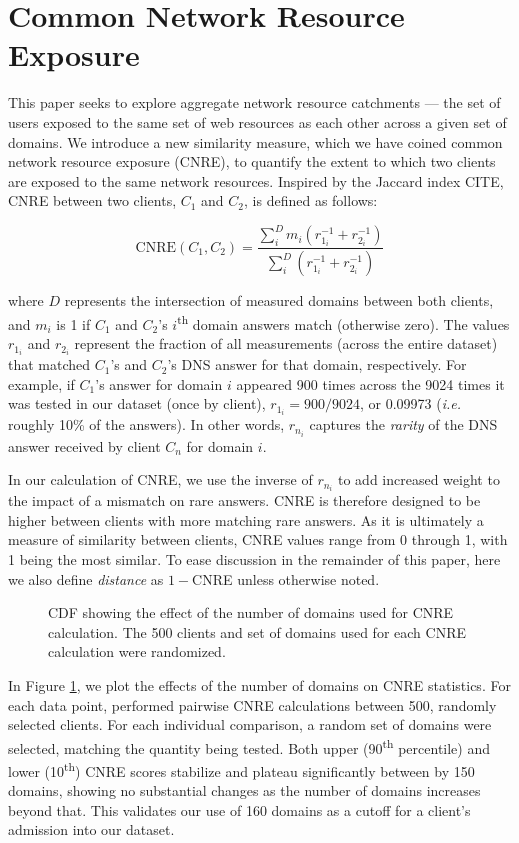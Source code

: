 \section{Common Network Resource Exposure} \label{sect:cnre}

This paper seeks to explore aggregate network resource catchments --- the set of
users exposed to the same set of web resources as each other across a given set
of domains. We introduce a new similarity measure, which we have coined common
network resource exposure (CNRE), to quantify the extent to which two clients
are exposed to the same network resources. Inspired by the Jaccard index CITE,
CNRE between two clients, $C_1$ and $C_2$, is defined as follows:

\[ \textrm{CNRE}(C_1, C_2) = \frac{ \sum_{i}^D  m_{i} (r_{1_i}^{-1}+r_{2_i}^{-1})}{ \sum_{i}^D (r_{1_i}^{-1}+r_{2_i}^{-1})} \]

where $D$ represents the intersection of measured domains between both clients, 
and $m_{i}$ is 1 if $C_{1}$ and $C_{2}$'s
$i$\textsuperscript{th} domain answers match (otherwise zero). The values
$r_{1_i}$ and $r_{2_i}$ represent the fraction of all measurements (across the
entire dataset) that matched $C_1$'s and $C_2$'s DNS answer for that domain,
respectively. For example, if $C_1$'s answer for domain $i$ appeared 900 times
across the 9024 times it was tested in our dataset (once by client), 
\(r_{1_i} =  900 / 9024\), or 0.09973 (\emph{i.e.} roughly 10\% of the answers). 
In other words, $r_{n_i}$ captures the
\emph{rarity} of the DNS answer received by client $C_n$ for domain $i$.

In our calculation of CNRE, we use the inverse of $r_{n_i}$ to add increased
weight to the impact of a mismatch on rare answers. CNRE is therefore designed
to be higher between clients with more matching rare answers. As it is
ultimately a measure of similarity between clients, CNRE values range from 0
through 1, with 1 being the most similar. To ease discussion in the remainder of
this paper, here we also define \emph{distance} as \(1 - \)CNRE unless otherwise
noted.

\begin{figure}
    \caption{CDF showing the effect of the number of domains used for CNRE
    calculation. The 500 clients and set of domains used for each CNRE
    calculation were randomized.}
    \label{fig:90cnre}
\end{figure}

In Figure \ref{fig:90cnre}, we plot the effects of the number of domains on CNRE
statistics. For each data point, performed pairwise CNRE calculations between
500, randomly selected clients. For each individual comparison, a random set of
domains were selected, matching the quantity being tested. Both upper
(90\textsuperscript{th}
percentile) and lower (10\textsuperscript{th}) CNRE scores stabilize and plateau
significantly between by 150 domains, showing no substantial changes as the
number of domains increases beyond that. This validates our use of 160 domains
as a cutoff for a client's admission into our dataset.


